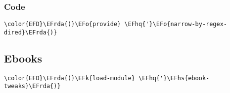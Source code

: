 \documentclass[a4wide,10pt]{article}
\newcommand{\EFk}[1]{\textcolor{EFk}{#1}} %
\newcommand{\EFo}[1]{\textcolor{EFo}{#1}} %
\newcommand{\EFhq}[1]{\textcolor{EFhq}{#1}} %
\newcommand{\EFhs}[1]{\textcolor{EFhs}{#1}} %
\newcommand{\EFrda}[1]{\textcolor{EFrda}{#1}} %
\begin{document}
\subsubsection{Code}
\label{sec:orgd0fad47}
\begin{Code}
\begin{Verbatim}
\color{EFD}\EFrda{(}\EFo{provide} \EFhq{'}\EFo{narrow-by-regex-dired}\EFrda{)}
\end{Verbatim}
\end{Code}
\subsection{Ebooks}
\label{sec:orgd5fa62b}
\begin{Code}
\begin{Verbatim}
\color{EFD}\EFrda{(}\EFk{load-module} \EFhq{'}\EFhs{ebook-tweaks}\EFrda{)}
\end{Verbatim}
\end{Code}
\end{document}
